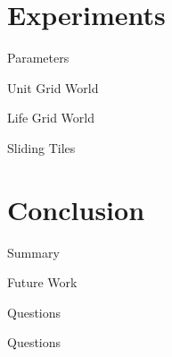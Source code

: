 \documentclass[style=unh]{powerdot}
\begin{document}

\section{Experiments}


\begin{slide}{Parameters}
\end{slide}


\begin{slide}{Unit Grid World}
\end{slide}


\begin{slide}{Life Grid World}
\end{slide}


\begin{slide}{Sliding Tiles}
\end{slide}


\section{Conclusion}


\begin{slide}{Summary}
\end{slide}


\begin{slide}{Future Work}
\end{slide}


\begin{slide}{Questions}
\end{slide}{Questions}

\end{document}
